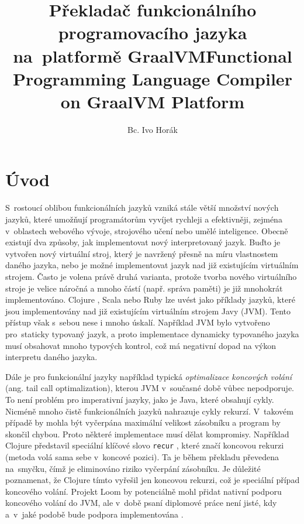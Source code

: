 \documentclass[
  master,
  biblatex,
  figures=true,
  theorems,
  sourcecodes,
  glossaries,
  index
]{kidiplom}
\title{Překladač funkcionálního programovacího jazyka na~platformě GraalVM}
\title[english]{Functional Programming Language Compiler on GraalVM Platform}
\author{Bc. Ivo Horák}
\begin{document}
\maketitle



\newcommand{\BibLaTeX}{\textsc{Bib}\LaTeX}

\section{Úvod}
S~rostoucí oblibou funkcionálních jazyků vzniká stále větší množství nových jazyků, které umožňují programátorům vyvíjet rychleji a efektivněji, zejména v~oblastech webového vývoje, strojového učení nebo umělé inteligence. Obecně existují dva způsoby, jak implementovat nový interpretovaný jazyk. Buďto je vytvořen nový virtuální stroj, který je navržený přesně na míru vlastnostem daného jazyka, nebo je možné implementovat jazyk nad již existujícím virtuálním strojem. Často je volena právě druhá varianta, protože tvorba nového virtuálního stroje je velice náročná a mnoho částí (např. správa paměti) je již mnohokrát implementováno. Clojure \cite{clojure-jvm}, Scala \cite{scala-jvm} nebo Ruby \cite{ruby-jvm} lze uvést jako příklady jazyků, které jsou implementovány nad již existujícím virtuálním strojem Javy (JVM). Tento přístup však s~sebou nese i mnoho úskalí. Například JVM bylo vytvořeno pro~staticky typovaný jazyk, a proto implementace dynamicky typovaného jazyka musí obsahovat mnoho typových kontrol, což má negativní dopad na výkon interpretu daného jazyka.  


Dále je pro funkcionální jazyky například typická \textit{optimalizace koncových volání} (ang. tail call optimalization), kterou JVM v~současné době vůbec nepodporuje. To není problém pro imperativní jazyky, jako je Java, které obsahují cykly. Nicméně mnoho čistě funkcionálních jazyků nahrazuje cykly rekurzí. V~takovém případě by mohla být vyčerpána maximální velikost zásobníku a program by skončil chybou. Proto některé implementace musí dělat kompromisy. Například Clojure představil speciální klíčové slovo \texttt{recur} \cite{recur-doc}, které značí koncovou rekurzi (metoda volá sama sebe v~koncové pozici). Ta je během překladu převedena na~smyčku, čímž je eliminováno riziko vyčerpání zásobníku. Je důležité poznamenat, že Clojure tímto vyřešil jen koncovou rekurzi, což je speciální případ koncového volání. Projekt Loom by potenciálně mohl přidat nativní podporu koncového volání do JVM, ale v~době psaní diplomové práce není jisté, kdy a~v~jaké podobě bude podpora implementována \cite{project-loom}.
\end{document}
